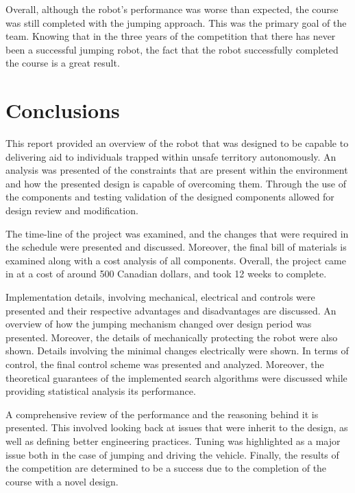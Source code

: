 \documentclass[ece]{uw-wkrpt}
\let\oldsection\section
\renewcommand\section{\clearpage\oldsection}
\begin{document}
Overall, although the robot’s performance was worse than expected, the course was still completed with the jumping approach. This was the primary goal of the team. Knowing that in the three years of the competition that there has never been a successful jumping robot, the fact that the robot successfully completed the course is a great result. 

\section{Conclusions}

This report provided an overview of the robot that was designed to be capable to delivering aid to individuals trapped within unsafe territory autonomously. An analysis was presented of the constraints that are present within the environment and how the presented design is capable of overcoming them. Through the use of the components and testing validation of the designed components allowed for design review and modification. 

The time-line of the project was examined, and the changes that were required in the schedule were presented and discussed. Moreover, the final bill of materials is examined along with a cost analysis of all components. Overall, the project came in at a cost of around 500 Canadian dollars, and took 12 weeks to complete. 

Implementation details, involving mechanical, electrical and controls were presented and their respective advantages and disadvantages are discussed. An overview of how the jumping mechanism changed over design period was presented. Moreover, the details of mechanically protecting the robot were also shown. Details involving the minimal changes electrically were shown. In terms of control, the final control scheme was presented and analyzed. Moreover, the theoretical guarantees of the implemented search algorithms were discussed while providing statistical analysis its performance. 

A comprehensive review of the performance and the reasoning behind it is presented. This involved looking back at issues that were inherit to the design, as well as defining better engineering practices. Tuning was highlighted as a major issue both in the case of jumping and driving the vehicle. Finally, the results of the competition are determined to be a success due to the completion of the course with a novel design. 

\end{document}
